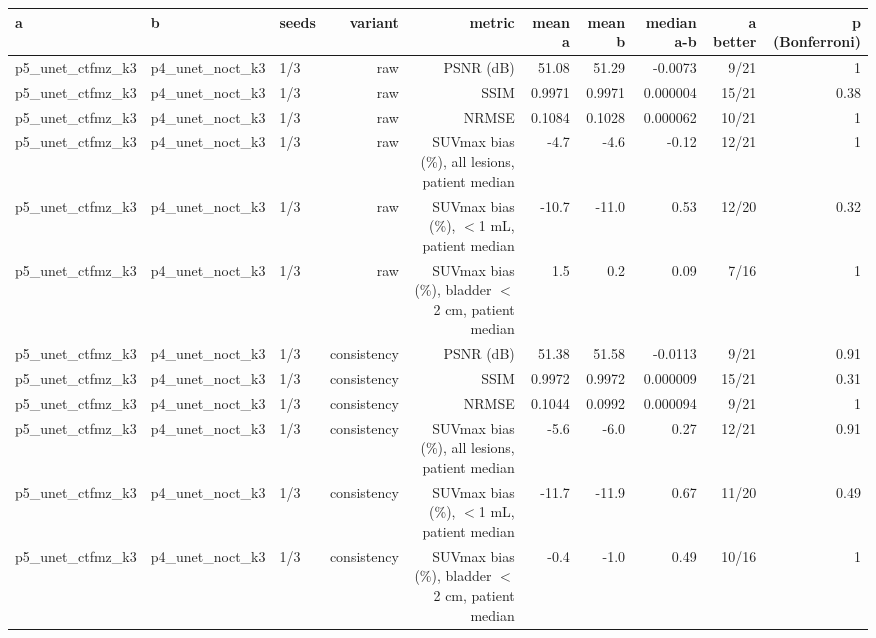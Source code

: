 \begin{tabular}{lllrrrrrrr}
\toprule
a & b & seeds & variant & metric & mean a & mean b & median a-b & a better & p (Bonferroni) \\
\midrule
p5\_unet\_ctfmz\_k3 & p4\_unet\_noct\_k3 & 1/3 & raw & PSNR (dB) & 51.08 & 51.29 & -0.0073 & 9/21 & 1 \\
p5\_unet\_ctfmz\_k3 & p4\_unet\_noct\_k3 & 1/3 & raw & SSIM & 0.9971 & 0.9971 & 0.000004 & 15/21 & 0.38 \\
p5\_unet\_ctfmz\_k3 & p4\_unet\_noct\_k3 & 1/3 & raw & NRMSE & 0.1084 & 0.1028 & 0.000062 & 10/21 & 1 \\
p5\_unet\_ctfmz\_k3 & p4\_unet\_noct\_k3 & 1/3 & raw & SUVmax bias (\%), all lesions, patient median & -4.7 & -4.6 & -0.12 & 12/21 & 1 \\
p5\_unet\_ctfmz\_k3 & p4\_unet\_noct\_k3 & 1/3 & raw & SUVmax bias (\%), $<$1 mL, patient median & -10.7 & -11.0 & 0.53 & 12/20 & 0.32 \\
p5\_unet\_ctfmz\_k3 & p4\_unet\_noct\_k3 & 1/3 & raw & SUVmax bias (\%), bladder $<$2 cm, patient median & 1.5 & 0.2 & 0.09 & 7/16 & 1 \\
p5\_unet\_ctfmz\_k3 & p4\_unet\_noct\_k3 & 1/3 & consistency & PSNR (dB) & 51.38 & 51.58 & -0.0113 & 9/21 & 0.91 \\
p5\_unet\_ctfmz\_k3 & p4\_unet\_noct\_k3 & 1/3 & consistency & SSIM & 0.9972 & 0.9972 & 0.000009 & 15/21 & 0.31 \\
p5\_unet\_ctfmz\_k3 & p4\_unet\_noct\_k3 & 1/3 & consistency & NRMSE & 0.1044 & 0.0992 & 0.000094 & 9/21 & 1 \\
p5\_unet\_ctfmz\_k3 & p4\_unet\_noct\_k3 & 1/3 & consistency & SUVmax bias (\%), all lesions, patient median & -5.6 & -6.0 & 0.27 & 12/21 & 0.91 \\
p5\_unet\_ctfmz\_k3 & p4\_unet\_noct\_k3 & 1/3 & consistency & SUVmax bias (\%), $<$1 mL, patient median & -11.7 & -11.9 & 0.67 & 11/20 & 0.49 \\
p5\_unet\_ctfmz\_k3 & p4\_unet\_noct\_k3 & 1/3 & consistency & SUVmax bias (\%), bladder $<$2 cm, patient median & -0.4 & -1.0 & 0.49 & 10/16 & 1 \\
\bottomrule
\end{tabular}
